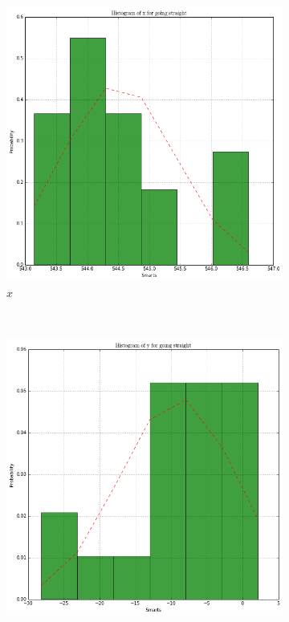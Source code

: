 \documentclass[paper=a4, fontsize=11pt]{scrartcl} %
\begin{document}
    \begin{figure}[h!]
        \centering
        \begin{subfigure}[b]{0.3\textwidth}
            \setlength{\fboxsep}{0.5pt} %
            \setlength{\fboxrule}{0.5pt}
            \includegraphics[width=\textwidth,fbox]{images/histogram_1_x_straight.png}
            \caption{$x$}
        \end{subfigure}
        ~
        \begin{subfigure}[b]{0.3\textwidth}
            \setlength{\fboxsep}{0.5pt} %
            \setlength{\fboxrule}{0.5pt}
            \includegraphics[width=\textwidth,fbox]{images/histogram_1_y_straight.png}

\end{subfigure}
\end{figure}
\end{document}
